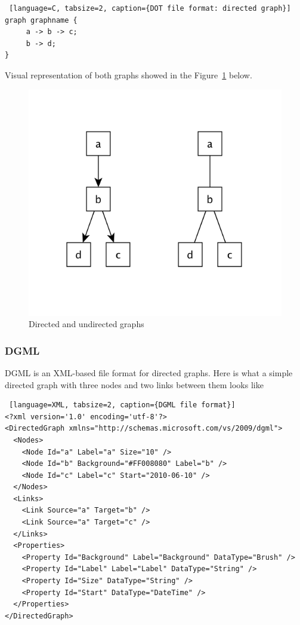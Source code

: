 \documentclass[a4paper,oneside]{article}
\begin{document}
\begin{center}
\begin{lstlisting} [language=C, tabsize=2, caption={DOT file format: directed graph}]
graph graphname {
     a -> b -> c;
     b -> d;
}
\end{lstlisting}
\end{center}

Visual representation of both graphs showed in the Figure~\ref{dot_graphs} below.

\begin{figure}
\begin{center}
    \includegraphics[scale=0.3]{pictures/dot_graph.png}
	\caption{Directed and undirected graphs}
	\label{dot_graphs}
\end{center}
\end{figure}

\subsubsection{DGML}
DGML is an XML-based file format for directed graphs. Here is what a simple directed graph with three nodes and two links between them looks like

\begin{center}
\begin{lstlisting} [language=XML, tabsize=2, caption={DGML file format}]
<?xml version='1.0' encoding='utf-8'?>
<DirectedGraph xmlns="http://schemas.microsoft.com/vs/2009/dgml">
  <Nodes>
    <Node Id="a" Label="a" Size="10" />
    <Node Id="b" Background="#FF008080" Label="b" />
    <Node Id="c" Label="c" Start="2010-06-10" />
  </Nodes>
  <Links>
    <Link Source="a" Target="b" />
    <Link Source="a" Target="c" />
  </Links>
  <Properties>
    <Property Id="Background" Label="Background" DataType="Brush" />
    <Property Id="Label" Label="Label" DataType="String" />
    <Property Id="Size" DataType="String" />
    <Property Id="Start" DataType="DateTime" />
  </Properties>
</DirectedGraph>
\end{lstlisting}
\end{center}
\end{document}
